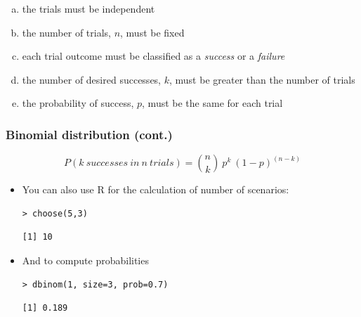 \documentclass[11pt,containsverbatim,handout,xcolor=xelatex,dvipsnames,table]{beamer}
\newcommand{\solnMult}[1]{#1}
\begin{document}

\begin{frame}


\begin{enumerate}[(a)]
\item the trials must be independent
\item the number of trials, $n$, must be fixed
\item each trial outcome must be classified as a \textit{success} or a \textit{failure}
\item \solnMult{the number of desired successes, $k$, must be greater than the number of trials}
\item the probability of success, $p$, must be the same for each trial
\end{enumerate}

\end{frame}


\begin{frame}[fragile]
\frametitle{Binomial distribution (cont.)}

\[P(k~successes~in~n~trials) = {n \choose k}~p^k~(1-p)^{(n-k)} \] 

\pause

\begin{itemize}

\item You can also use R for the calculation of number of scenarios:
{\footnotesize
\begin{Verbatim}[frame=single, formatcom=\color{blue}]
> choose(5,3)
\end{Verbatim}
}
{\footnotesize
\begin{Verbatim}[frame=single, formatcom=\color{gray}]
[1] 10
\end{Verbatim}
}

\pause

\item And to compute probabilities
{\footnotesize
\begin{Verbatim}[frame=single, formatcom=\color{blue}]
> dbinom(1, size=3, prob=0.7)
\end{Verbatim}
}
{\footnotesize
\begin{Verbatim}[frame=single, formatcom=\color{gray}]
[1] 0.189
\end{Verbatim}
}

\end{itemize}

\end{frame}
\end{document}
